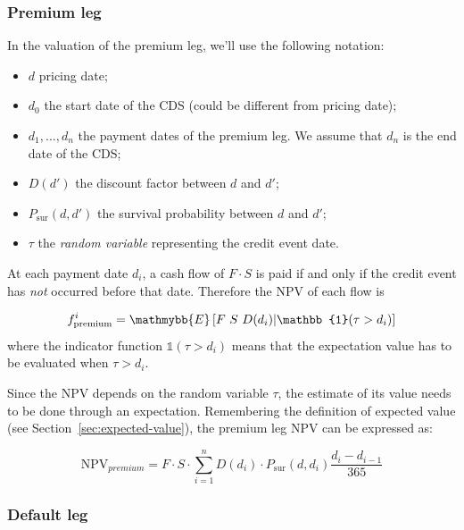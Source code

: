 \subsubsection{Premium leg}\label{premium-leg}

In the valuation of the premium leg, we'll use the following notation:

\begin{itemize}
\tightlist
\item $d$ pricing date;
\item $d_0$ the start date of the CDS (could be different from pricing date);
\item $d_1, ..., d_n$ the payment dates of the premium leg. We assume that $d_n$ is the end date of the CDS;
\item $D(d')$ the discount factor between $d$ and $d'$;
\item $P_{\textrm{sur}}(d, d')$ the survival probability between $d$ and $d'$;
\item $\tau$ the \emph{random variable} representing the credit event date.
\end{itemize}

At each payment date $d_i$, a cash flow of $F\cdot S$ is paid if and only if the credit event has \emph{not} occurred before that date. Therefore the NPV of each flow is

\begin{equation}
f_{\textrm{premium}}^i = \mathmybb{E}\left[F~S~D(d_i)|\mathbb{1}(\tau > d_i) \right]
\end{equation}
where the indicator function $\mathbb{1}(\tau > d_i)$ means that the expectation value has to be evaluated when $\tau > d_i$. 

Since the NPV depends on the random variable $\tau$, the estimate of its value needs to be done through an expectation.
Remembering the definition of expected value (see Section~\ref{sec:expected-value}), %
the premium leg NPV can be expressed as:

\begin{equation}
\textrm{NPV}_{premium} = F\cdot S \cdot \sum_{i=1}^{n} D(d_i) \cdot P_{\textrm{sur}}(d, d_i)\frac{d_i-d_{i-1}}{365}
\end{equation}

\subsubsection{Default leg}
\label{default-leg}

